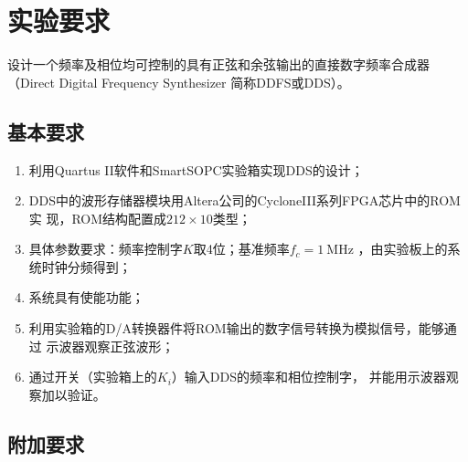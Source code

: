 \documentclass[twoside, openright]{article}
\begin{document}

\newpage

\renewcommand{\headrulewidth}{0.4pt}
\fancyhead[RE, LO]{}



\setcounter{tocdepth}{2}

\renewcommand{\contentsname}{\zihao{3}\heiti 目次}
\tableofcontents
\listoffigures
\listoftables

\newpage
{}

\section{实验要求}%
\label{sec:实验要求}

设计一个频率及相位均可控制的具有正弦和余弦输出的直接数字频率合成器（Direct
Digital Frequency Synthesizer 简称DDFS或DDS）。

\subsection{基本要求}%
\label{sub:基本要求}

\begin{enumerate}

	\item 利用Quartus II软件和SmartSOPC实验箱实现DDS的设计；

	\item DDS中的波形存储器模块用Altera公司的CycloneIII系列FPGA芯片中的ROM实
		现，ROM结构配置成$ 212\times 10 $类型；

	\item 具体参数要求：频率控制字$ K $取4位；基准频率$ f_c = \SI{1}{\MHz} $
		，由实验板上的系统时钟分频得到；

	\item 系统具有使能功能；

	\item 利用实验箱的D/A转换器件将ROM输出的数字信号转换为模拟信号，能够通过
		示波器观察正弦波形；

	\item 通过开关（实验箱上的$ K_i $）输入DDS的频率和相位控制字，
		并能用示波器观察加以验证。

\end{enumerate}

\subsection{附加要求}%
\label{sub:附加要求}
\end{document}
